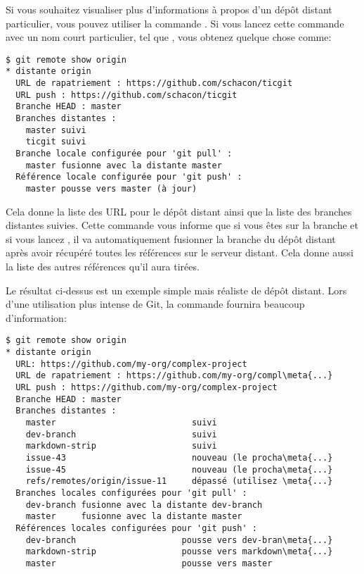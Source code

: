 Si vous souhaitez visualiser plus d'informations à propos d'un dépôt distant particulier, vous pouvez utiliser la commande .
Si vous lancez cette commande avec un nom court particulier, tel que , vous obtenez quelque chose comme:
\begin{Schunk}
\begin{Verbatim}
$ git remote show origin
* distante origin
  URL de rapatriement : https://github.com/schacon/ticgit
  URL push : https://github.com/schacon/ticgit
  Branche HEAD : master
  Branches distantes :
    master suivi
    ticgit suivi
  Branche locale configurée pour 'git pull' :
    master fusionne avec la distante master
  Référence locale configurée pour 'git push' :
    master pousse vers master (à jour)
\end{Verbatim}
\end{Schunk}

Cela donne la liste des URL pour le dépôt distant ainsi que la liste des branches distantes suivies.
Cette commande vous informe que si vous êtes sur la branche  et si vous lancez , il va automatiquement fusionner la branche  du dépôt distant après avoir récupéré toutes les références sur le serveur distant.
Cela donne aussi la liste des autres références qu'il aura tirées.

Le résultat ci-dessus est un exemple simple mais réaliste de dépôt distant.
Lors d'une utilisation plus intense de Git, la commande  fournira beaucoup d'information:
\begin{Schunk}
\begin{Verbatim}[commandchars=\\\{\}]
$ git remote show origin
* distante origin
  URL: https://github.com/my-org/complex-project
  URL de rapatriement : https://github.com/my-org/compl\meta{...}
  URL push : https://github.com/my-org/complex-project
  Branche HEAD : master
  Branches distantes :
    master                           suivi
    dev-branch                       suivi
    markdown-strip                   suivi
    issue-43                         nouveau (le procha\meta{...}
    issue-45                         nouveau (le procha\meta{...}
    refs/remotes/origin/issue-11     dépassé (utilisez \meta{...}
  Branches locales configurées pour 'git pull' :
    dev-branch fusionne avec la distante dev-branch
    master     fusionne avec la distante master
  Références locales configurées pour 'git push' :
    dev-branch                     pousse vers dev-bran\meta{...}
    markdown-strip                 pousse vers markdown\meta{...}
    master                         pousse vers master
\end{Verbatim}
\end{Schunk}

